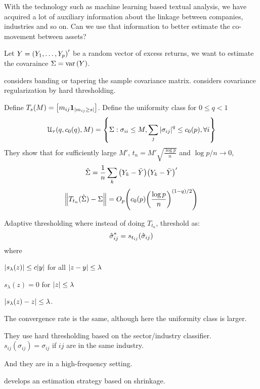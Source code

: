     With the technology such as machine learning based textual analysis, we have acquired a lot of auxiliary information about the linkage between companies, industries and so on. Can we use that information to better estimate the co-movement between assets?

    Let \(Y = \pqty{Y_{1},\dots,Y_{p}}'\) be a random vector of excess returns, we want to estimate the covaraince \(\Sigma = \variance\pqty{Y}\). 

    \cite{bickel2008CovarianceRegularization} considers banding or tapering the sample covariance matrix. \cite{bickel2008CovarianceRegularization} considers covariance regularization by hard thresholding. 
    \begin{review} 
        Define \(T_{s}(M) = \bqty{m_{ij} \mathbf{1}_{\abs{m_{ij} \geq s}}}\). Define the uniformity class for \(0 \leq q < 1\) 
        \begin{equation}
            \mathcal{U}_{\tau}(q,c_{0}(q),M) = \Bqty{\Sigma: \sigma_{ii}\leq M, \sum_{j}\abs{\sigma_{ij}}^{q}\leq c_{0}(p), \forall i}
        \end{equation}
        They show that for sufficiently large \(M'\), \(t_{n} = M'\sqrt{\frac{\log p}{n}} \) and \(\log p /n \to 0\), 
        \begin{equation}
            \hat{\Sigma} = \frac{1}{n} \sum_{k} \pqty{Y_{k} - \bar{Y}}\pqty{Y_{k} - \bar{Y}}'
        \end{equation}
        \begin{equation}
            \norm{T_{t_{n}}(\hat{\Sigma}) - \Sigma} = O_{p}\pqty{c_{0}(p) \pqty{\frac{\log p}{n}}^{(1-q)/2}}
        \end{equation}
    \end{review}


    \begin{review}
        Adaptive thresholding where instead of doing \(T_{t_{n}}\), threshold as:
        \begin{equation}
            \hat{\sigma}_{ij}^{*} = s_{t_{ij}}\pqty{\hat{\sigma}_{ij}}
        \end{equation}
        where \begin{enumerate*}
            \item \(\abs{s_{\lambda}(z)} \leq c \abs{y}\) for all \(\abs{z - y}\leq \lambda\)
            \item \(s_{\lambda}(z) = 0\) for \(\abs{z}\leq \lambda\)
            \item \(\abs{s_{\lambda}(z) - z} \leq \lambda\).
        \end{enumerate*}

        The convergence rate is the same, although here the uniformity class is larger. 
    \end{review}
    \begin{review}
        They use hard thresholding based on the sector/industry classifier. \(s_{ij}(\sigma_{ij})= \sigma_{ij}\) if \(ij\) are in the same industry. 

        And they are in a high-frequency setting. 
    \end{review}

    \cite{ledoit2004HoneyShrunk} develops an estimation strategy based on shrinkage. 